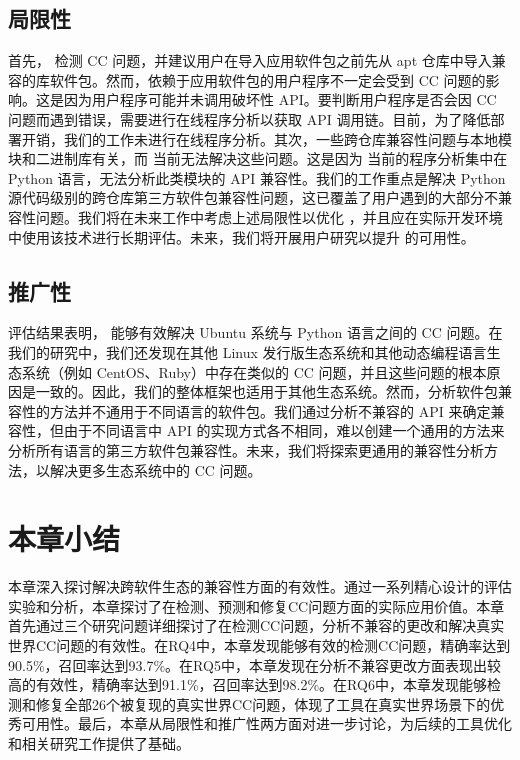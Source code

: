 \subsection{局限性}
首先，\tool{} 检测 CC 问题，并建议用户在导入应用软件包之前先从 apt 仓库中导入兼容的库软件包。然而，依赖于应用软件包的用户程序不一定会受到 CC 问题的影响。这是因为用户程序可能并未调用破坏性 API。要判断用户程序是否会因 CC 问题而遇到错误，需要进行在线程序分析以获取 API 调用链。目前，为了降低部署开销，我们的工作未进行在线程序分析。其次，一些跨仓库兼容性问题与本地模块和二进制库有关，而 \tool{} 当前无法解决这些问题。这是因为 \tool{} 当前的程序分析集中在 Python 语言，无法分析此类模块的 API 兼容性。我们的工作重点是解决 Python 源代码级别的跨仓库第三方软件包兼容性问题，这已覆盖了用户遇到的大部分不兼容性问题。我们将在未来工作中考虑上述局限性以优化 \tool{}，并且应在实际开发环境中使用该技术进行长期评估。未来，我们将开展用户研究以提升 \tool{} 的可用性。
\subsection{推广性}
评估结果表明，\tool{} 能够有效解决 Ubuntu 系统与 Python 语言之间的 CC 问题。在我们的研究中，我们还发现在其他 Linux 发行版生态系统和其他动态编程语言生态系统（例如 CentOS、Ruby）中存在类似的 CC 问题，并且这些问题的根本原因是一致的。因此，我们的整体框架也适用于其他生态系统。然而，分析软件包兼容性的方法并不通用于不同语言的软件包。我们通过分析不兼容的 API 来确定兼容性，但由于不同语言中 API 的实现方式各不相同，难以创建一个通用的方法来分析所有语言的第三方软件包兼容性。未来，我们将探索更通用的兼容性分析方法，以解决更多生态系统中的 CC 问题。

\section{本章小结}
本章深入探讨\tool{}解决跨软件生态的兼容性方面的有效性。通过一系列精心设计的评估实验和分析，本章探讨了\tool{}在检测、预测和修复CC问题方面的实际应用价值。本章首先通过三个研究问题详细探讨了\tool{}在检测CC问题，分析不兼容的更改和解决真实世界CC问题的有效性。在RQ4中，本章发现\tool{}能够有效的检测CC问题，精确率达到90.5\%，召回率达到93.7\%。在RQ5中，本章发现\tool{}在分析不兼容更改方面表现出较高的有效性，精确率达到91.1\%，召回率达到98.2\%。在RQ6中，本章发现\tool{}能够检测和修复全部26个被复现的真实世界CC问题，体现了工具在真实世界场景下的优秀可用性。最后，本章从局限性和推广性两方面对\tool{}进一步讨论，为后续的工具优化和相关研究工作提供了基础。